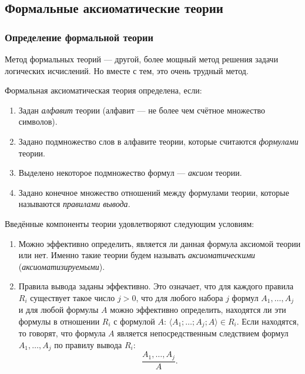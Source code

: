 \subsection{Формальные аксиоматические теории}
\subsubsection{Определение формальной теории}
Метод формальных теорий --- другой, более мощный метод решения задачи логических исчислений. Но вместе с тем, это очень трудный метод.

Формальная аксиоматическая теория определена, если:
\begin{enumerate}
    \item Задан \textit{алфавит} теории (алфавит --- не более чем счётное множество символов).
    \item Задано подмножество слов в алфавите теории, которые считаются \textit{формулами} теории.
    \item Выделено некоторое подмножество формул --- \textit{аксиом} теории.
    \item Задано конечное множество отношений между формулами теории, которые называются \textit{правилами вывода}.
\end{enumerate}

Введённые компоненты теории удовлетворяют следующим условиям:
\begin{enumerate}
    \item Можно эффективно определить, является ли данная формула аксиомой теории или нет. Именно такие теории будем называть \textit{аксиоматическими} (\textit{аксиоматизируемыми}).
    \item Правила вывода заданы эффективно. Это означает, что для каждого правила $R_i$ существует такое число $j > 0$, что для любого набора $j$ формул $A_1, \dots, A_j$ и для любой формулы $A$ можно эффективно определить, находятся ли эти формулы в отношении $R_i$ с формулой $A$: $\langle A_1; \dots; A_j; A\rangle \in R_i$. Если находятся, то говорят, что формула $A$ является непосредственным следствием формул $A_1, \dots, A_j$ по правилу вывода $R_i$:
    \[
        \frac{A_1, \dots, A_j}{A}.
    \]
\end{enumerate}

